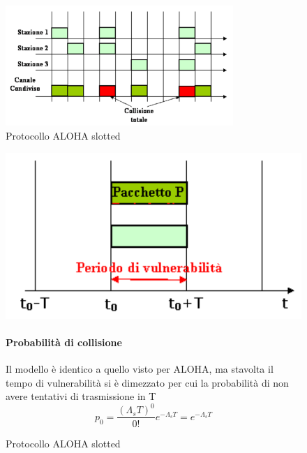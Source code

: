 \begin{figure}[htbp]
    \centering
    \includegraphics[width=0.77\textwidth]{images/slottedaloha.png}
    \caption{Protocollo ALOHA slotted}
    \label{fig:slotted-aloha}
\end{figure}



\begin{figure}[htbp]
    \centering
    \begin{minipage}{0.43\textwidth}
        \includegraphics[width=\linewidth]{images/periodoslotted.png}
        \caption{Protocollo ALOHA slotted}
        \label{fig:slotted-aloha}
    \end{minipage}%
    \hfill
    \begin{minipage}{0.45\textwidth}
        \paragraph{Probabilità di collisione}
        Il modello è identico a quello visto per ALOHA, ma stavolta il tempo di vulnerabilità
        si è dimezzato per cui la probabilità di non avere tentativi di trasmissione in T
        \begin{equation}
            p_0 = \frac{(\Lambda_s T)^0}{0!} e^{-\Lambda_s T} = e^{-\Lambda_s T}
        \end{equation}
    \end{minipage}
\end{figure}

